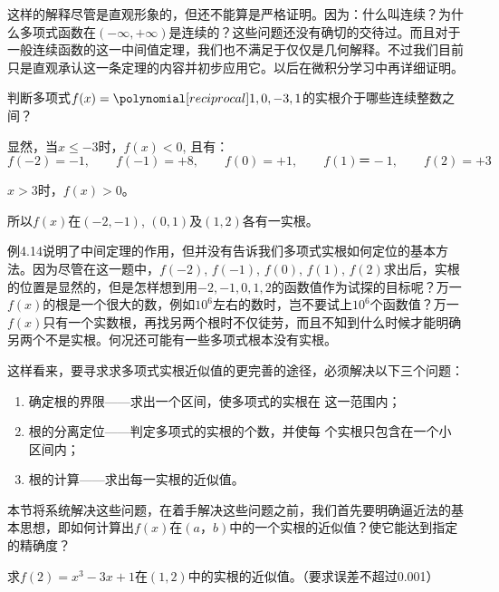 这样的解释尽管是直观形象的，但还不能算是严格证明。因为：什么叫连续？为什么多项式函数在$(-\infty,+\infty)$是连续的？这些问题还没有确切的交待过。而且对于一般连续函数的这一中间值定理，我们也不满足于仅仅是几何解释。不过我们目前只是直观承认这一条定理的内容并初步应用它。以后在微积分学习中再详细证明。

\begin{example}
    判断多项式$f(x)=\poly{1,0,-3,1}$的实根介于哪些连续整数之间？
\end{example}

\begin{solution}
显然，当$x\le -3$时，$f(x)<0$, 且有：
\[f (-2) =-1,\qquad f (-1) =+8,\qquad f (0) =+1,\qquad f (1)＝-1,\qquad f(2)=+3\]

$x>3$时，$f(x)>0$。

所以$f(x)$在$(-2,-1)$, $(0, 1)$及$(1, 2)$各有一实根。
\end{solution}
    
例4.14说明了中间定理的作用，但并没有告诉我们多项式实根如何定位的基本方法。因为尽管在这一题中，$f(-2)$, $f(-1)$, $f(0)$, $f(1)$, $f(2)$求出后，实根的位置是显然的，但是怎样想到用$-2,-1, 0, 1, 2$的函数值作为试探的目标呢？万一$f(x)$的根是一个很大的数，例如$10^6$左右的数时，岂不要试上$10^6$个函数值？万一$f(x)$只有一个实数根，再找另两个根时不仅徒劳，而且不知到什么时候才能明确另两个不是实根。何况还可能有一些多项式根本没有实根。

这样看来，要寻求求多项式实根近似值的更完善的途径，必须解决以下三个问题：
\begin{enumerate}
\item 确定根的界限——求出一个区间，使多项式的实根在
这一范围内；    
\item 根的分离定位——判定多项式的实根的个数，并使每
个实根只包含在一个小区间内；    
\item 根的计算——求出每一实根的近似值。
\end{enumerate}

本节将系统解决这些问题，在着手解决这些问题之前，我们首先要明确逼近法的基本思想，即如何计算出$f(x)$在$(a，b)$中的一个实根的近似值？使它能达到指定的精确度？

\begin{example}
    求$f(2)=x^3-3x+1$在$(1, 2)$中的实根的近似值。（要求误差不超过0.001）
\end{example}

